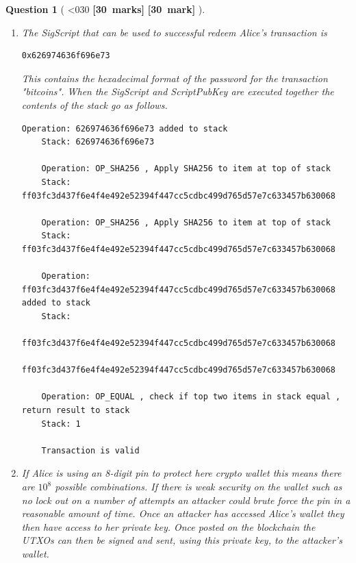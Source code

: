 \documentclass[a4paper]{article}
\theoremstyle{que}
\newtheorem{question}{Question}
\newcommand{\fixoffset}{\mbox{}\vspace*{-\bigskipamount}\vspace*{-\medskipamount}}
\newcommand\points[1]{%
\ifnum1<0#1\relax%
    {\bf \small [#1~marks]}%
  \else%
    {\bf \small [#1~mark]}%
  \fi%
}%
\begin{document}
\begin{question}[\points{30}]
  \fixoffset
  \begin{enumerate}[label=(\alph*)]
    \item The SigScript that can be used to successful redeem Alice's transaction is
    \begin{lstlisting}[basicstyle=\ttfamily]
    0x626974636f696e73
    \end{lstlisting}
    This contains the hexadecimal format of the password for the transaction "bitcoins". When the SigScript and ScriptPubKey are executed together the contents of the stack go as follows.
\begin{lstlisting}[basicstyle=\ttfamily, breaklines=true]
    Operation: 626974636f696e73 added to stack
    Stack: 626974636f696e73

    Operation: OP_SHA256 , Apply SHA256 to item at top of stack
    Stack: ff03fc3d437f6e4f4e492e52394f447cc5cdbc499d765d57e7c633457b630068

    Operation: OP_SHA256 , Apply SHA256 to item at top of stack
    Stack: ff03fc3d437f6e4f4e492e52394f447cc5cdbc499d765d57e7c633457b630068

    Operation: ff03fc3d437f6e4f4e492e52394f447cc5cdbc499d765d57e7c633457b630068 added to stack
    Stack:
    ff03fc3d437f6e4f4e492e52394f447cc5cdbc499d765d57e7c633457b630068
    ff03fc3d437f6e4f4e492e52394f447cc5cdbc499d765d57e7c633457b630068

    Operation: OP_EQUAL , check if top two items in stack equal , return result to stack
    Stack: 1

    Transaction is valid
\end{lstlisting}
    \item If Alice is using an 8-digit pin to protect here crypto wallet this means there are \( 10^8\) possible combinations. If there is weak security on the wallet such as no lock out on a number of attempts an attacker could brute force the pin in a reasonable amount of time. Once an attacker has accessed Alice's wallet they then have access to her private key. Once posted on the blockchain the UTXOs can then be signed and sent, using this private key, to the attacker's wallet.
    

\end{enumerate}
\end{question}
\end{document}
